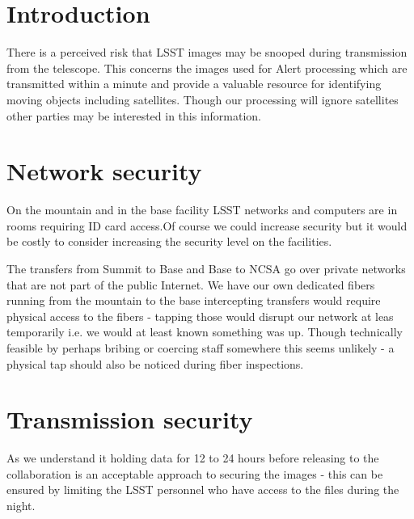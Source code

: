 \section{Introduction} \label{sec:intro}


There is a perceived  risk that LSST  images may be snooped during transmission from the telescope. This concerns the images used for Alert processing which are transmitted within a minute and provide a valuable resource for identifying moving objects including satellites. Though our processing will ignore satellites other parties may be interested in this information.

\section{Network security}\label{sec:net}

On the mountain and in the base facility LSST networks and computers are in rooms requiring ID card access.Of course we could increase security but it would be costly to consider increasing the security level on the facilities.

The transfers from Summit to Base and Base to NCSA go over private networks that are not part of the public Internet. We have our own dedicated fibers running from the mountain to the base 
intercepting transfers would require physical access to the fibers - tapping those would disrupt our network at leas temporarily i.e. we would at least known something was up.  Though technically feasible by perhaps bribing or coercing staff somewhere this seems unlikely - a physical tap should also be noticed during fiber inspections.


\section{Transmission security} \label{sec:trans}
As we understand it holding data for 12 to 24 hours before releasing to the collaboration is an acceptable approach to securing the images - this can be ensured by limiting the LSST personnel who have access to the files during the night.
